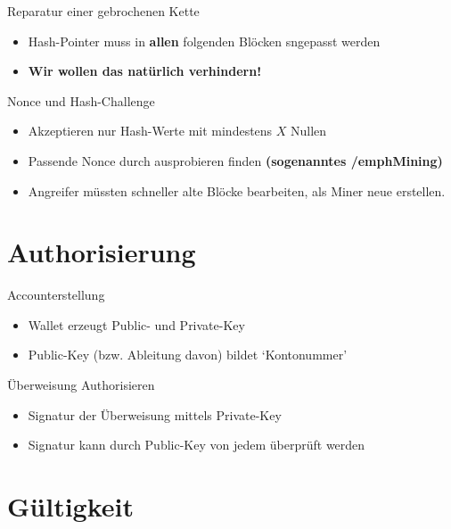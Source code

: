 \documentclass[aspectratio=169]{beamer}
\begin{document}
\begin{frame}{Reparatur einer gebrochenen Kette}
    \begin{itemize}
        \item Hash-Pointer muss in \textbf{allen} folgenden Blöcken sngepasst werden
        \pause
        \item \textbf{Wir wollen das natürlich verhindern!}
    \end{itemize}
\end{frame}


\begin{frame}{Nonce und Hash-Challenge}
    \begin{itemize}
        \item Akzeptieren nur Hash-Werte mit mindestens $X$ Nullen
        \item Passende Nonce durch ausprobieren finden \textbf{(sogenanntes /emph{Mining})}
        \item Angreifer müssten schneller alte Blöcke bearbeiten, als Miner neue erstellen.
    \end{itemize}
\end{frame}






\section{Authorisierung}

\begin{frame}{Accounterstellung}
    \begin{itemize}
        \item Wallet erzeugt Public- und Private-Key
        \item Public-Key (bzw. Ableitung davon) bildet `Kontonummer'
    \end{itemize}
\end{frame}


\begin{frame}{Überweisung Authorisieren}
    \begin{itemize}
        \item Signatur der Überweisung mittels Private-Key
        \item Signatur kann durch Public-Key von jedem überprüft werden
    \end{itemize}
\end{frame}





\section{Gültigkeit}
\end{document}
